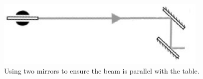 \documentclass[a4paper]{report}
\begin{document}
\begin{figure}[h]
\center
\includegraphics[width=4in]{laser_height.eps}
\caption{Using two mirrors to ensure the beam is parallel with the table. }
\label{fig:ex2}
\end{figure}
\end{document}
